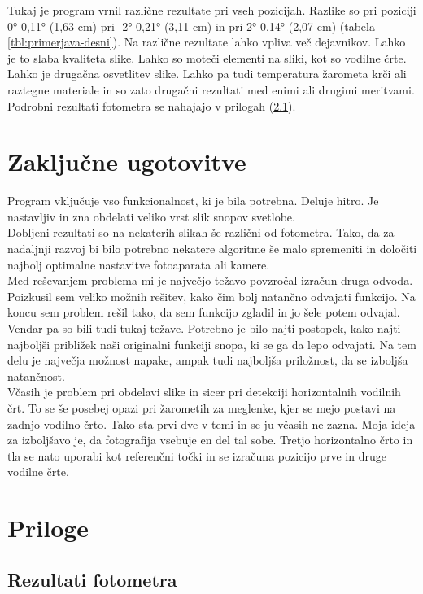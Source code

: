 \documentclass[oneside, a4paper, 12pt]{book}
\begin{document}
Tukaj je program vrnil različne rezultate pri vseh pozicijah. Razlike so pri poziciji 0° 0,11° (1,63 cm) pri -2° 0,21° (3,11 cm) in pri 2° 0,14° (2,07 cm) (tabela \ref{tbl:primerjava-desni}). Na različne rezultate lahko vpliva več dejavnikov. Lahko je to slaba kvaliteta slike. Lahko so moteči elementi na sliki, kot so vodilne črte. Lahko je drugačna osvetlitev slike. Lahko pa tudi temperatura žarometa krči ali raztegne materiale in so zato drugačni rezultati med enimi ali drugimi meritvami. Podrobni rezultati fotometra se nahajajo v prilogah (\ref{ch:rf}).

\chapter{Zaključne ugotovitve}
Program vključuje vso funkcionalnost, ki je bila potrebna. Deluje hitro. Je nastavljiv in zna obdelati veliko vrst slik snopov svetlobe.\\
Dobljeni rezultati so na nekaterih slikah še različni od fotometra. Tako, da za nadaljnji razvoj bi bilo potrebno nekatere algoritme še malo spremeniti in določiti najbolj optimalne nastavitve fotoaparata ali kamere.\\
Med reševanjem problema mi je največjo težavo povzročal izračun druga odvoda. Poizkusil sem veliko možnih rešitev, kako čim bolj natančno odvajati funkcijo. Na koncu sem problem rešil tako, da sem funkcijo zgladil in jo šele potem odvajal. Vendar pa so bili tudi tukaj težave. Potrebno je bilo najti postopek, kako najti najboljši približek naši originalni funkciji snopa, ki se ga da lepo odvajati. Na tem delu je največja možnost napake, ampak tudi najboljša priložnost, da se izboljša natančnost.\\
Včasih je problem pri obdelavi slike in sicer pri detekciji horizontalnih vodilnih črt. To se še posebej opazi pri žarometih za meglenke, kjer se mejo postavi na zadnjo vodilno črto. Tako sta prvi dve v temi in se ju včasih ne zazna. Moja ideja za izboljšavo je, da fotografija vsebuje en del tal sobe. Tretjo horizontalno črto in tla se nato uporabi kot referenčni točki in se izračuna pozicijo prve in druge vodilne črte.

\chapter{Priloge}
\section{Rezultati fotometra}
\label{ch:rf}
\end{document}
